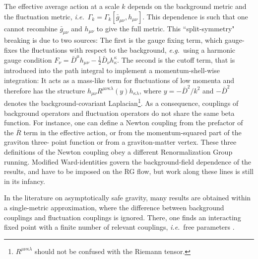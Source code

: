 \documentclass[11pt]{book} %
\newcommand\ie{\textit{i.e.}\ }
\newcommand\eg{\textit{e.g.}\ }
\numberwithin{equation}{chapter}
\begin{document}
The effective average action at a scale $k$
depends on the background metric and the fluctuation metric,
\ie $\Gamma_k = \Gamma_k[\bar{g}_{\mu \nu}, h_{\mu \nu}]$.
This dependence is such that one cannot recombine $\bar{g}_{\mu \nu}$
and $h_{\mu \nu}$ to give the full metric.
This ``split-symmetry" breaking is due to two sources:
The first is the gauge fixing term, which gauge-fixes the fluctuations with respect to the background,
\eg using a harmonic gauge condition
$F_{\nu}=\bar{D}^{\mu}h_{\mu \nu} -\frac{1}{2} \bar{D}_{\nu}h^{\kappa}_{\kappa}$.
The second is the cutoff term, that is introduced into the path integral to implement
a momentum-shell-wise integration: It acts as a mass-like term for fluctuations of low momenta and
therefore has the structure $h_{\mu \nu} R^{\mu \nu \kappa \lambda} (y) h_{\kappa \lambda}$,
where $y=-\bar{D}^2/k^2$ and $-\bar{D}^2$ denotes the background-covariant
Laplacian\footnote{$R^{\mu \nu \kappa \lambda}$ should not be confused with the
Riemann tensor.}.
As a consequence, couplings of background operators and fluctuation operators do not share the same
beta function. For instance, one can define a Newton coupling from the prefactor of the $\bar{R}$ term
in the effective action, or from the momentum-squared part of the graviton three- point function or
from a graviton-matter vertex.
These three definitions of the Newton coupling obey a different Renormalization Group running.
Modified Ward-identities govern the background-field dependence of the results,
and have to be imposed on the RG flow, but work along these lines is still in its infancy.

In the literature on asymptotically safe gravity, many results are obtained within a
single-metric approximation, where the difference between background couplings and fluctuation couplings
is ignored. There, one finds an interacting fixed point with a finite number of relevant couplings,
\ie free parameters
\cite{
  Reuter:1996cp, Dou:1997fg, Reuter:2001ag, Lauscher:2001ya, Lauscher:2002sq, Litim:2003vp,
  Fischer:2006fz, Machado:2007ea, Eichhorn:2009ah, Codello:2006in, Codello:2008vh,
  Benedetti:2009rx, Eichhorn:2010tb, Groh:2010ta, Manrique:2011jc, Rechenberger:2012dt, Benedetti:2012dx,
  Dietz:2012ic, Falls:2013bv, Benedetti:2013jk, Ohta:2013uca, Demmel:2014sga, Falls:2014tra, Falls:2015qga,
  Falls:2015cta, Gies:2015tca, Demmel:2015oqa}.
\end{document}
